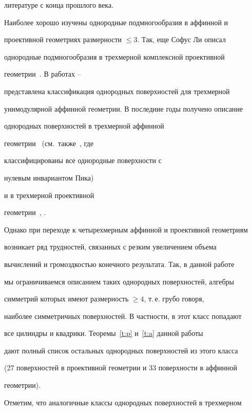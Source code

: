 литературе с конца прошлого века. 





Наиболее хорошо изучены однородные подмногообразия в аффинной и


проективной геометриях размерности $\le3$. Так, еще Софус Ли описал


однородные подмногообразия в трехмерной комплексной проективной


геометрии~\cite{lie:ga6}. В работах \cite{fav:gdl}--\cite{ns:adg}


представлена классификация однородных поверхностей для трехмерной


унимодулярной аффинной геометрии. В последние годы получено описание


однородных поверхностей в трехмерной аффинной


геометрии~\cite{nr:nk} (см.\ также~\cite{adv:1997}, где


классифицированы все однородные поверхности с 


нулевым инвариантом Пика)


и в трехмерной проективной


геометрии~\cite{ns:1991}, \cite{dsv:1998}.





Однако при переходе к четырехмерным аффинной и проективной геометриям


возникает ряд трудностей, связанных с резким увеличением объема


вычислений и громоздкостью конечного результата. Так, в данной работе


мы ограничиваемся описанием таких однородных поверхностей, алгебры


симметрий которых имеют размерность $\ge4$, т.\,е. грубо говоря,


наиболее симметричных поверхностей. В частности, в этот класс попадают


все цилиндры и квадрики. Теоремы~\ref{t:p} и~\ref{t:a} данной работы


дают полный список остальных однородных поверхностей из этого класса


(27 поверхностей в проективной геометрии и 33 поверхности в аффинной


геометрии).





Отметим, что аналогичные классы однородных поверхностей в трехмерном


